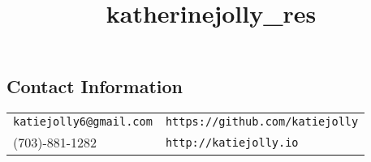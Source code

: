 \documentclass[margin,line,pifont,palatino,courier]{res}
\begin{document}
\title{katherinejolly_res}
\begin{resume}

\section{\sc Contact Information}

\vspace{.05in}
\begin{tabular}{@{}p{2.75in}p{2in}}
\verb+katiejolly6@gmail.com+ &\verb+https://github.com/katiejolly+ \\
(703)-881-1282 & \verb+http://katiejolly.io+
   
\end{tabular}










\end{resume}
\end{document}
